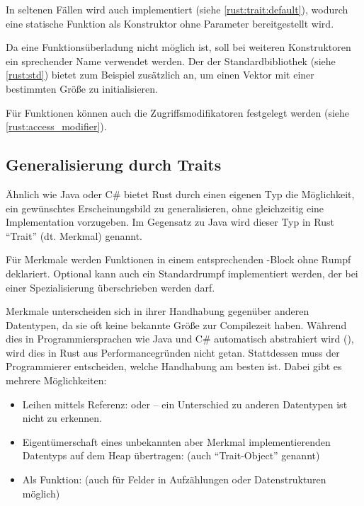 In seltenen Fällen wird auch  implementiert (siehe \autoref{rust:trait:default}), wodurch eine statische Funktion  als Konstruktor ohne Parameter bereitgestellt wird.

Da eine Funktionsüberladung nicht möglich ist, soll bei weiteren Konstruktoren ein sprechender Name verwendet werden.
Der  der Standardbibliothek (siehe \autoref{rust:std}) bietet zum Beispiel zusätzlich  an, um einen Vektor mit einer bestimmten Größe zu initialisieren.

Für Funktionen können auch die Zugriffsmodifikatoren festgelegt werden (siehe \autoref{rust:access_modifier}). 

\subsection{Generalisierung durch Traits}
\label{rust:trait:default}

Ähnlich wie Java oder C\# bietet Rust durch einen eigenen Typ die Möglichkeit, ein gewünschtes Erscheinungsbild zu generalisieren, ohne gleichzeitig eine Implementation vorzugeben.
Im Gegensatz zu Java wird dieser Typ in Rust \enquote{Trait} (dt. Merkmal) genannt.

Für Merkmale werden Funktionen in einem entsprechenden -Block ohne Rumpf deklariert.
Optional kann auch ein Standardrumpf implementiert werden, der bei einer Spezialisierung überschrieben werden darf.

Merkmale unterscheiden sich in ihrer Handhabung gegenüber anderen Datentypen, da sie oft keine bekannte Größe zur Compilezeit haben.
Während dies in Programmiersprachen wie Java und C\# automatisch abstrahiert wird (), wird dies in Rust aus Performancegründen nicht getan.
Stattdessen muss der Programmierer entscheiden, welche Handhabung am besten ist.
 Dabei gibt es mehrere Möglichkeiten:
\begin{itemize}
	\item Leihen mittels Referenz:  oder  -- ein Unterschied zu anderen Datentypen ist nicht zu erkennen.
	\item Eigentümerschaft eines unbekannten aber Merkmal implementierenden Datentyps auf dem Heap übertragen:  (auch \enquote{Trait-Object} genannt)
	\item Als  Funktion:  (auch für Felder in Aufzählungen oder Datenstrukturen möglich)
\end{itemize}

